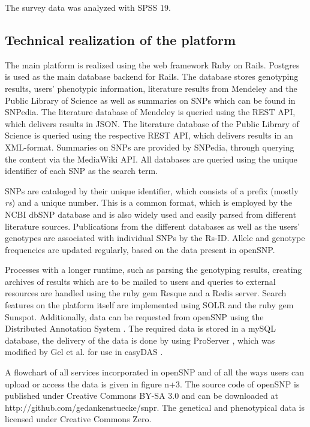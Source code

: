 \documentclass[10pt]{article}
\begin{document}
The survey data was analyzed with SPSS 19. 

\subsection*{Technical realization of the platform}
The main platform is realized using the web framework Ruby on Rails. Postgres is used as the main database backend for Rails. The database stores genotyping results, users' phenotypic information, literature results from Mendeley and the Public Library of Science as well as summaries on SNPs which can be found in SNPedia. The literature database of Mendeley is queried using the REST API, which delivers results in JSON. The literature database of the Public Library of Science is queried using the respective REST API, which delivers results in an XML-format. Summaries on SNPs are provided by SNPedia, through querying the content via the MediaWiki API. All databases are queried using the unique identifier of each SNP as the search term. 

SNPs are cataloged by their unique identifier, which consists of a prefix (mostly \textit{rs}) and a unique number. This is a common format, which is employed by the NCBI dbSNP database and is also widely used and easily parsed from different literature sources. Publications from the different databases as well as the users' genotypes are associated with individual SNPs by the Rs-ID. Allele and genotype frequencies are updated regularly, based on the data present in openSNP. 

Processes with a longer runtime, such as parsing the genotyping results, creating archives of results which are to be mailed to users and queries to external resources are handled using the ruby gem Resque and a Redis server. Search features on the platform itself are implemented using SOLR and the ruby gem Sunspot. Additionally, data can be requested from openSNP using the Distributed Annotation System \cite{Dowell2001,Jenkinson2008}. The required data is stored in a mySQL database, the delivery of the data is done by using ProServer \cite{Finn2007}, which was modified by Gel et al. for use in easyDAS \cite{GelMoreno2011}.  

A flowchart of all services incorporated in openSNP and of all the ways users can upload or access the data is given in figure n+3. The source code of openSNP is published under Creative Commons BY-SA 3.0 and can be downloaded at http://github.com/gedankenstuecke/snpr. The genetical and phenotypical data is licensed under Creative Commons Zero. 
\end{document}
